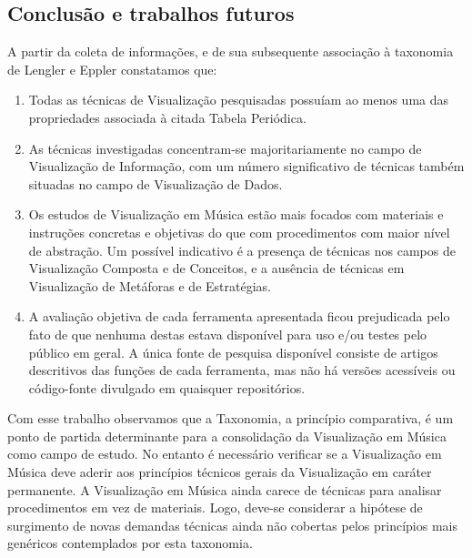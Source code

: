 \documentclass{sciposter}
\begin{document}
\begin{multicols}{2}




\section{Conclusão e trabalhos futuros}

A partir da coleta de informações, e de sua subsequente associação à taxonomia
de Lengler e Eppler constatamos que:

\begin{enumerate}
\item Todas as técnicas de Visualização pesquisadas possuíam ao menos uma das
propriedades associada à citada Tabela Periódica.
\item As técnicas investigadas concentram-se majoritariamente no campo de
Visualização de Informação, com um número significativo de técnicas também
situadas no campo de Visualização de Dados.
\item Os estudos de Visualização em Música estão mais focados com materiais e
instruções concretas e objetivas do que com procedimentos com maior nível de
abstração. Um possível indicativo é a presença de técnicas nos campos de
Visualização Composta e de Conceitos, e a ausência de técnicas em Visualização
de Metáforas e de Estratégias.
\item A avaliação objetiva de cada ferramenta apresentada ficou prejudicada pelo
fato de que nenhuma destas estava disponível para uso e/ou testes pelo público
em geral. A única fonte de pesquisa disponível consiste de artigos descritivos
das funções de cada ferramenta, mas não há versões acessíveis ou código-fonte
divulgado em quaisquer repositórios.
\end{enumerate}

Com esse trabalho observamos que a Taxonomia, a princípio comparativa, é um
ponto de partida determinante para a consolidação da Visualização em Música
como campo de estudo. No entanto é necessário verificar se a Visualização em
Música deve aderir aos princípios técnicos gerais da Visualização em caráter
permanente. A Visualização em Música ainda carece de técnicas para analisar
procedimentos em vez de materiais. Logo, deve-se considerar a hipótese de
surgimento de novas demandas técnicas ainda não cobertas pelos princípios mais
genéricos contemplados por esta taxonomia.


\end{multicols}
\end{document}
